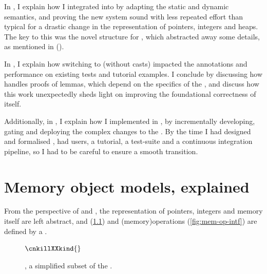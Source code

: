 In , I explain how I integrated  into
 by adapting the static and dynamic semantics, and proving the
new system sound with less repeated effort than typical for a drastic change in
the representation of pointers, integers and heaps. The key to this was the
novel structure for , which abstracted away some details, as
mentioned in ().

In , I explain how switching to 
(without  casts) impacted the annotations and performance on existing
 tests and tutorial examples. I conclude by discussing how 
handles proofs of lemmas, which depend on the specifics of the , and discuss how this work unexpectedly sheds light on
improving the foundational correctness of  itself.

Additionally, in , I explain how I implemented
 in , by incrementally developing, gating and deploying the
complex changes to the . By the time I had designed and
formalised ,  had users, a tutorial, a test-suite and a
continuous integration pipeline, so I had to be careful to ensure a smooth
transition.

\chapter{Memory object models, explained}\label{chap:mem-model-explained}

\margintoc%
%
From the perspective of  and , the representation of
pointers, integers and memory itself are left abstract, and 
(\cref{fig:mem-action-intf}) and \kl(memory){operations}
(\cref{fig:mem-op-intf}) are defined by a .

\begin{figure}
    \ContinuedFloat*%
    \small%
    \raggedright%
    \begingroup%
    \renewcommand{\cnprodline}{\cnprodlinecomment}
    \grammartabularSTY{%
        \cnaction{}\cnafterlastrule{}
    }
    \endgroup%

    \begingroup%
    \renewcommand{\cnrulehead}[3]{\begin{mathbreakcomma}#1\end{mathbreakcomma} \mathrel{{\Colon}{=}}}
    \renewcommand{\cnfirstprodline}[6]{#2}
    \renewcommand{\cnprodline}[6]{\StrIfInTF{#3}{M}{}{\StrIfInTF{#5}{P}{}{\ #1\ #2}}}{}
    \renewcommand{\cnprodnewline}{}
    $\cnkillXXkind{}$
    \endgroup%
    \caption{ , a simplified subset of the
         .}\label{fig:mem-action-intf}
\end{figure}

